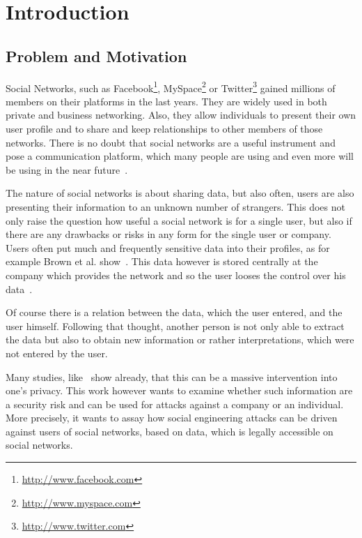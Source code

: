 \chapter{Introduction}
\label{chap:introduction}

\section{Problem and Motivation}

Social Networks, such as Facebook\footnote{\url{http://www.facebook.com}},
MySpace\footnote{\url{http://www.myspace.com}} or
Twitter\footnote{\url{http://www.twitter.com}} gained millions of members on
their platforms in the last years. They are widely used in both private and
business networking. Also, they allow individuals to present their own user
profile and to share and keep relationships to other members of those networks.
There is no doubt that social networks are a useful instrument and pose a
communication platform, which many people are using and even more will be using
in the near future~\cite{whitworth2009}.

The nature of social networks is about sharing data, but also often, users are
also presenting their information to an unknown number of strangers. This does
not only raise the question how useful a social network is for a single user,
but also if there are any drawbacks or risks in any form for the single user or
company. Users often put much and frequently sensitive data into their
profiles, as for example Brown et al. show~\cite{brown2008}. This data however is stored
centrally at the company which provides the network and so the user looses the
control over his data~\cite{fraunhofer2008}.

Of course there is a relation between the data, which the user entered, and the
user himself. Following that thought, another person is not only able to
extract the data but also to obtain new information or rather interpretations,
which were not entered by the user.

Many studies, like~\cite{fraunhofer2008,gross2005} show already, that this can
be a massive intervention into one's privacy. This work however wants to
examine whether such information are a security risk and can be used for
attacks against a company or an individual. More precisely, it wants to assay
how social engineering attacks can be driven against users of social networks,
based on data, which is legally accessible on social networks.

